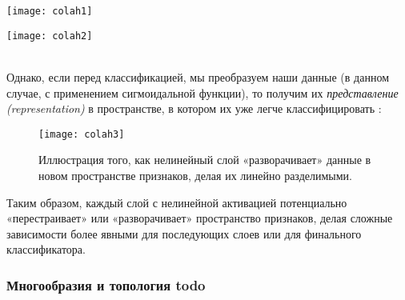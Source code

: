 \begin{minipage}{0.35\textwidth}
    \texttt{[image: colah1]}
    \label{fig:colah1}
\end{minipage}
\hspace{80pt}
\begin{minipage}{0.35\textwidth}
    \texttt{[image: colah2]}
    \label{fig:colah2}
\end{minipage}\\

Однако, если перед классификацией, мы преобразуем наши данные 
(в данном случае, с применением сигмоидальной функции), 
то получим их \textit{представление (representation)} в 
пространстве, в котором их уже легче классифицировать \cite{colah}:

\begin{figure}[h!]
    \centering
    \texttt{[image: colah3]}
    \caption{Иллюстрация того, как нелинейный слой «разворачивает» 
    данные в новом пространстве признаков, делая их линейно разделимыми.}
    \label{fig:colah3}
\end{figure}

Таким образом, каждый слой с нелинейной активацией потенциально «перестраивает» или 
«разворачивает» пространство признаков, делая сложные зависимости более явными для 
последующих слоев или для финального классификатора.

\subsubsection{Многообразия и топология {\color{red} todo}}







